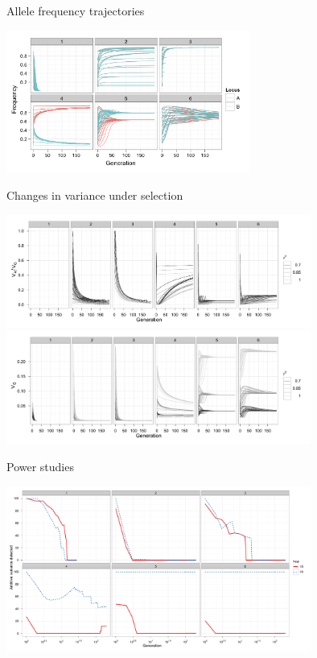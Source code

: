 \documentclass{beamer}
\begin{document}
\begin{frame}{Allele frequency trajectories}
\begin{center}
\includegraphics[width=8cm]{allelefreq_det.png}
\end{center}
\end{frame}

\begin{frame}{Changes in variance under selection}
\begin{center}
\includegraphics[width=10cm]{propadditive_det_grey.pdf} \\
\includegraphics[width=10cm]{Vg_det_grey.pdf}
\end{center}
\end{frame}

\begin{frame}{Power studies}
\begin{center}
\includegraphics[width=10cm]{powersimple.pdf} \\
\end{center}
\end{frame}
\end{document}
